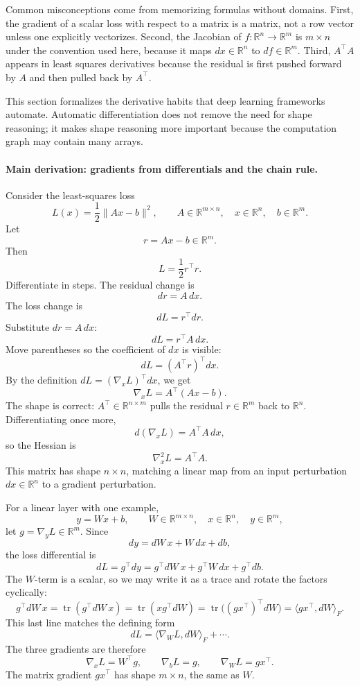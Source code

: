 Common misconceptions come from memorizing formulas without domains. First, the gradient of a scalar loss with respect to a matrix is a matrix, not a row vector unless one explicitly vectorizes. Second, the Jacobian of \(f:\mathbb{R}^n\to\mathbb{R}^m\) is \(m\times n\) under the convention used here, because it maps \(dx\in\mathbb{R}^n\) to \(df\in\mathbb{R}^m\). Third, \(A^\top A\) appears in least squares derivatives because the residual is first pushed forward by \(A\) and then pulled back by \(A^\top\).

This section formalizes the derivative habits that deep learning frameworks automate. Automatic differentiation does not remove the need for shape reasoning; it makes shape reasoning more important because the computation graph may contain many arrays.

\paragraph{Main derivation: gradients from differentials and the chain rule.}
Consider the least-squares loss
\[
L(x)=\frac12\|Ax-b\|^2,
\qquad
A\in\mathbb{R}^{m\times n},
\quad x\in\mathbb{R}^n,
\quad b\in\mathbb{R}^m.
\]
Let
\[
r=Ax-b\in\mathbb{R}^m.
\]
Then
\[
L=\frac12 r^\top r.
\]
Differentiate in steps. The residual change is
\[
dr=A\,dx.
\]
The loss change is
\[
dL=r^\top dr.
\]
Substitute \(dr=A\,dx\):
\[
dL=r^\top A\,dx.
\]
Move parentheses so the coefficient of \(dx\) is visible:
\[
dL=(A^\top r)^\top dx.
\]
By the definition \(dL=(\nabla_x L)^\top dx\), we get
\[
\nabla_x L=A^\top(Ax-b).
\]
The shape is correct: \(A^\top\in\mathbb{R}^{n\times m}\) pulls the residual \(r\in\mathbb{R}^m\) back to \(\mathbb{R}^n\).
Differentiating once more,
\[
d(\nabla_x L)=A^\top A\,dx,
\]
so the Hessian is
\[
\nabla_x^2L=A^\top A.
\]
This matrix has shape \(n\times n\), matching a linear map from an input perturbation \(dx\in\mathbb{R}^n\) to a gradient perturbation.

For a linear layer with one example,
\[
y=Wx+b,
\qquad
W\in\mathbb{R}^{m\times n},
\quad x\in\mathbb{R}^n,
\quad y\in\mathbb{R}^m,
\]
let \(g=\nabla_y L\in\mathbb{R}^m\). Since
\[
dy=dW\,x+W\,dx+db,
\]
the loss differential is
\[
dL=g^\top dy
=g^\top dW\,x+g^\top W\,dx+g^\top db.
\]
The \(W\)-term is a scalar, so we may write it as a trace and rotate the factors cyclically:
\[
g^\top dW\,x
=\operatorname{tr}(g^\top dW\,x)
=\operatorname{tr}(xg^\top dW)
=\operatorname{tr}\big((gx^\top)^\top dW\big)
=\langle gx^\top,dW\rangle_F.
\]
This last line matches the defining form
\[
dL=\langle \nabla_W L,dW\rangle_F+\cdots.
\]
The three gradients are therefore
\[
\nabla_x L=W^\top g,
\qquad
\nabla_b L=g,
\qquad
\nabla_W L=gx^\top.
\]
The matrix gradient \(gx^\top\) has shape \(m\times n\), the same as \(W\).

